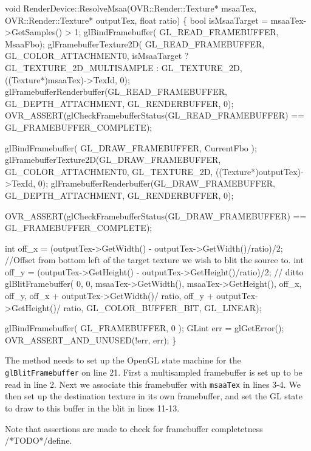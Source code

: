 \documentclass[12pt,a4paper,twoside,openright]{report}
\begin{document}
\begin{blockcode}[commandchars=\\\{\}, numbers=left]
void RenderDevice::ResolveMsaa(OVR::Render::Texture* msaaTex, OVR::Render::Texture* outputTex, float ratio)
\{
    bool isMsaaTarget = msaaTex->GetSamples() > 1;
    glBindFramebuffer( GL_READ_FRAMEBUFFER, MsaaFbo);
    glFramebufferTexture2D( GL_READ_FRAMEBUFFER, GL_COLOR_ATTACHMENT0,
                            isMsaaTarget ? GL_TEXTURE_2D_MULTISAMPLE : GL_TEXTURE_2D,
                            ((Texture*)msaaTex)->TexId, 0);
    glFramebufferRenderbuffer(GL_READ_FRAMEBUFFER, GL_DEPTH_ATTACHMENT, GL_RENDERBUFFER, 0);
    OVR_ASSERT(glCheckFramebufferStatus(GL_READ_FRAMEBUFFER) == GL_FRAMEBUFFER_COMPLETE);

    glBindFramebuffer( GL_DRAW_FRAMEBUFFER, CurrentFbo );
    glFramebufferTexture2D(GL_DRAW_FRAMEBUFFER, GL_COLOR_ATTACHMENT0, GL_TEXTURE_2D, ((Texture*)outputTex)->TexId, 0);
    glFramebufferRenderbuffer(GL_DRAW_FRAMEBUFFER, GL_DEPTH_ATTACHMENT, GL_RENDERBUFFER, 0);

    OVR_ASSERT(glCheckFramebufferStatus(GL_DRAW_FRAMEBUFFER) == GL_FRAMEBUFFER_COMPLETE);

\color{green}    int off_x = (outputTex->GetWidth() - outputTex->GetWidth()/ratio)/2; //Offset from bottom left of the target texture we wish to blit the source to. 
\color{green}    int off_y = (outputTex->GetHeight() - outputTex->GetHeight()/ratio)/2; // ditto
\color{green}    glBlitFramebuffer( 0, 0, msaaTex->GetWidth(), msaaTex->GetHeight(), off_x, off_y,
\color{green}                             off_x + outputTex->GetWidth()/ ratio,
\color{green}                             off_y + outputTex->GetHeight()/ ratio,
\color{green}                             GL_COLOR_BUFFER_BIT, GL_LINEAR);

    glBindFramebuffer( GL_FRAMEBUFFER, 0 );  
    GLint err = glGetError();
    OVR_ASSERT_AND_UNUSED(!err, err);
\}
\end{blockcode}

The method needs to set up the OpenGL state machine for the \texttt{glBlitFramebuffer} on line 21. First a multisampled framebuffer is set up to be read in line 2. Next we associate this framebuffer with \texttt{msaaTex} in lines 3-4. 
We then set up the destination texture in its own framebuffer, and set the GL state to draw to this buffer in the blit in lines 11-13.

Note that assertions are made to check for framebuffer completetness /*TODO*/define.
\end{document}
